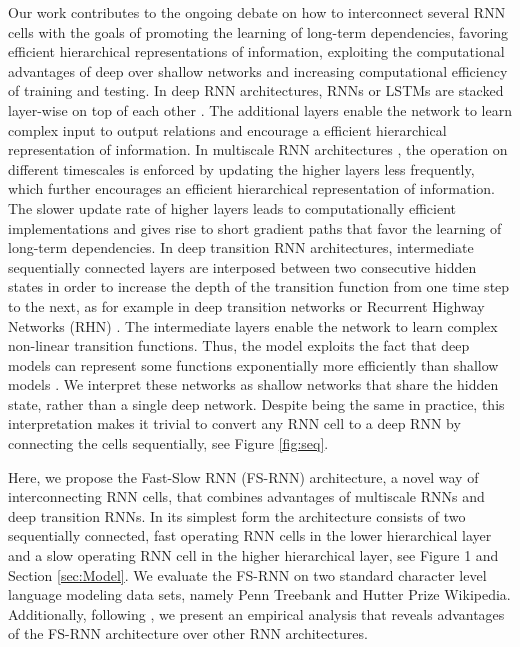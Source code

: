 \documentclass{article}
\begin{document}
 Our work contributes to the ongoing debate on how to interconnect several RNN cells with the goals of promoting the learning of long-term dependencies,  favoring efficient hierarchical representations of information, exploiting the computational advantages of deep  over shallow networks and  increasing computational efficiency of training and testing.
In deep RNN architectures, RNNs or LSTMs are stacked layer-wise on top of each other \cite{el1995hierarchical, jaeger2007discovering, graves2013sequences}. The additional layers enable the network to learn complex input to output relations and encourage a efficient hierarchical representation of information.  
In  multiscale RNN architectures \cite{schmidhuber1992learning, el1995hierarchical, koutnik2014clockwork, chung2016multiscale}, the operation on different timescales is enforced by updating the higher layers less frequently, which further encourages an efficient hierarchical representation of information. The slower update rate of higher layers leads to computationally efficient implementations and gives rise to short gradient paths that favor the learning of long-term dependencies.
In deep transition RNN architectures, intermediate sequentially connected layers are interposed between two consecutive hidden states in order to increase the  depth of the transition function from one time step to the next, as for example in deep transition networks \cite{pascanu2013construct} or Recurrent Highway Networks (RHN) \cite{zilly2016recurrent}. The intermediate layers enable the network to learn complex non-linear transition functions. Thus, the model exploits the fact that deep  models can represent some functions exponentially more efficiently than shallow models \cite{bengio2009learning}. We interpret these networks as shallow networks that share the hidden state, rather than a single deep network. Despite being the same in practice, this interpretation makes it trivial to convert any RNN cell to a deep RNN by connecting the cells sequentially, see Figure \ref{fig:seq}.

 Here, we propose the Fast-Slow RNN (FS-RNN) architecture,  a novel way of interconnecting RNN cells, that combines advantages of  multiscale RNNs and deep transition RNNs. In its  simplest form the architecture consists of  two sequentially connected, fast operating RNN cells in the lower hierarchical layer and a slow operating RNN cell in the higher hierarchical layer, see Figure 1 and Section \ref{sec:Model}. 
We evaluate the FS-RNN  on two standard character level language modeling data sets, namely Penn Treebank and Hutter Prize Wikipedia. Additionally, following \cite{pascanu2013construct}, we present an empirical analysis that reveals advantages of the  FS-RNN architecture over other RNN architectures. 
\end{document}
